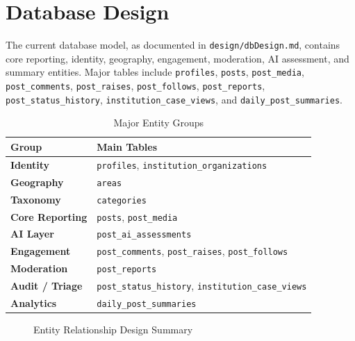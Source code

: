 \documentclass[12pt,a4paper]{report}
\begin{document}
\section{Database Design}
The current database model, as documented in \texttt{design/dbDesign.md}, contains core reporting, identity, geography, engagement, moderation, AI assessment, and summary entities. Major tables include \texttt{profiles}, \texttt{posts}, \texttt{post\_media}, \texttt{post\_comments}, \texttt{post\_raises}, \texttt{post\_follows}, \texttt{post\_reports}, \texttt{post\_status\_history}, \texttt{institution\_case\_views}, and \texttt{daily\_post\_summaries}.

\begin{table}[H]
\centering
\caption{Major Entity Groups}
\begin{tabularx}{\textwidth}{>{\bfseries}lX}
\toprule
Group & Main Tables \\
\midrule
Identity & \texttt{profiles}, \texttt{institution\_organizations} \\
Geography & \texttt{areas} \\
Taxonomy & \texttt{categories} \\
Core Reporting & \texttt{posts}, \texttt{post\_media} \\
AI Layer & \texttt{post\_ai\_assessments} \\
Engagement & \texttt{post\_comments}, \texttt{post\_raises}, \texttt{post\_follows} \\
Moderation & \texttt{post\_reports} \\
Audit / Triage & \texttt{post\_status\_history}, \texttt{institution\_case\_views} \\
Analytics & \texttt{daily\_post\_summaries} \\
\bottomrule
\end{tabularx}
\end{table}

\begin{figure}[H]
\centering
{}
\caption{Entity Relationship Design Summary}
\end{figure}
\end{document}
